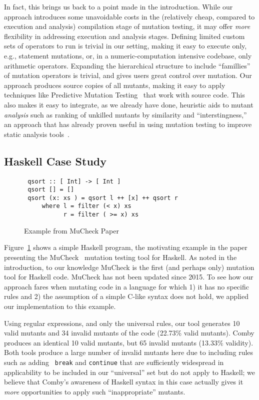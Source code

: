 \documentclass[acmsmall]{acmart}
\begin{document}
{In fact, this brings us back to a point made in the introduction.
While our approach introduces some unavoidable costs in the
(relatively cheap, compared to execution and analysis) compilation stage of
mutation testing, it may offer \emph{more} flexibility in addressing
execution and analysis stages.  Defining limited custom sets of
operators to run is trivial in our setting, making it easy to
execute only, e.g., statement mutations, or, in a numeric-computation
intensive codebase, only arithmetic operators.  Expanding the
hierarchical structure to include ``famillies'' of mutation operators
is trivial, and gives users great control over mutation.  Our approach
produces source
copies of all mutants, making it easy to apply techniques
like Predictive Mutation Testing~\cite{zhangPMT} that work with source
code.  This also makes it easy to integrate, as we already have done, heuristic
aids to mutant \emph{analysis} such as ranking of unkilled mutants by
similarity and ``interstingness,'' an approach that has already proven
useful in using mutation testing to improve static analysis tools~\cite{StatMut}.
\subsection{Haskell Case Study}

\begin{figure}

\begin{lstlisting}
 qsort :: [ Int] -> [ Int ]
 qsort [] = []
 qsort (x: xs ) = qsort l ++ [x] ++ qsort r
     where l = filter (< x) xs
           r = filter ( >= x) xs
\end{lstlisting}
\caption{\small Example from MuCheck Paper~\cite{mucheck}}
\label{fig:haskell}
\end{figure}

Figure~\ref{fig:haskell} shows a simple Haskell program, the
motivating example in the paper presenting the MuCheck~\cite{mucheck}
mutation testing tool for Haskell.  As noted in the introduction, to our
knowledge MuCheck is the first (and perhaps only) mutation tool for
Haskell code.  MuCheck has not been updated since 2015.
To see how our approach fares when mutating code in a language for
which 1) it has no specific rules and 2) the assumption of a simple
C-like syntax does not hold, we applied our implementation to this example.

Using regular expressions, and only the universal rules, our tool
generates 10 valid mutants and 34 invalid mutants of the code (22.73\%
valid mutants).  Comby produces an identical 10 valid mutants, but 65
invalid mutants (13.33\% validity).  Both tools produce a large number
of invalid mutants here due to including rules such as adding {\tt
  break} and {\tt continue} that are sufficiently widespread in
applicability to be included in our ``universal'' set but do not apply
to Haskell; we believe that Comby's awareness of Haskell syntax in
this case actually gives it \emph{more} opportunities to apply such
``inappropriate'' mutants.

}
\end{document}
